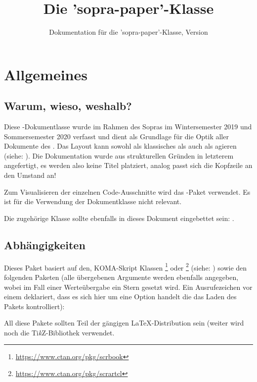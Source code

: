 \documentclass[useartcl,notoc]{sopra-paper}
\title{Die 'sopra-paper'-Klasse}
\subtitle[Dokumentation für die 'sopra-paper'-Klasse]{Dokumentation für die 'sopra-paper'-Klasse, Version \thesopversion}
\begin{document}
\section{Allgemeines}
\subsection{Warum, wieso, weshalb?}
    Diese \LaTeXe-Dokumentlasse wurde im Rahmen des Sopras im
    Wintersemester 2019 und Sommersemester 2020 verfasst und dient als
    Grundlage für die Optik aller Dokumente des .
    Das Layout kann sowohl als klassisches  als auch als  agieren (siehe: ). Die Dokumentation wurde aus strukturellen Gründen in letzterem angefertigt, es werden also keine Titel platziert, analog passt sich die Kopfzeile an den Umstand an!\par
    Zum Visualisieren der einzelnen Code-Ausschnitte wird das
    -Paket verwendet. Es ist für die Verwendung der Dokumentklasse
    nicht relevant.\par
    Die zugehörige Klasse sollte ebenfalls in dieses Dokument eingebettet sein: .
\subsection{Abhängigkeiten}
    Dieses Paket basiert auf den, KOMA-Skript Klassen \footnote{\url{https://www.ctan.org/pkg/scrbook}} oder \footnote{\url{https://www.ctan.org/pkg/scrartcl}} (siehe:  )
    sowie den folgenden Paketen (alle übergebenen Argumente werden ebenfalls
    angegeben, wobei im Fall einer Werteübergabe ein Stern gesetzt wird. Ein Ausrufezeichen vor einem  deklariert, dass es sich hier um eine Option handelt die das Laden des Pakets kontrolliert):
    \begin{multicols}{3}
    \end{multicols}
    All diese Pakete sollten Teil der gängigen \LaTeX-Distribution sein (weiter
    wird noch die Ti\textit{k}Z-Bibliothek  verwendet.
\end{document}
